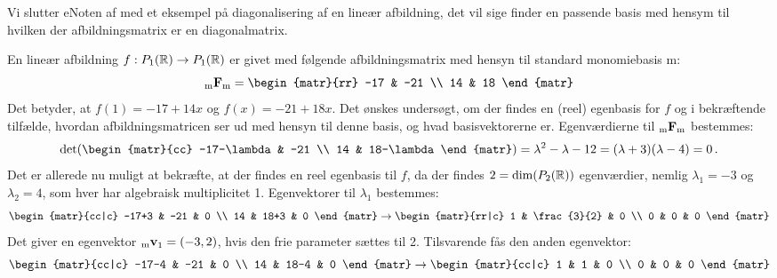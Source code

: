 Vi slutter eNoten af med et eksempel på diagonalisering af en lineær afbildning, det vil sige finder en passende basis med hensym til hvilken der afbildningsmatrix er en diagonalmatrix.

\begin{example}
En lineær afbildning $ f: P_1(\mathbb{R}) \rightarrow P_1(\mathbb{R}) $ er givet med følgende afbildningsmatrix med hensyn til standard monomiebasis m:
\begin{equation}
\matind mFm = \begin{matr}{rr} -17 & -21 \\ 14 & 18 \end{matr}
\end{equation}
Det betyder, at $ f(1) = -17 + 14x $ og $ f(x) = -21 + 18x $. Det ønskes undersøgt, om der findes en (reel) egenbasis for $ f $ og i bekræftende tilfælde, hvordan afbildningsmatricen ser ud med hensyn til denne basis, og hvad basisvektorerne er. \bs
Egenværdierne til $ {_\mathrm{m}\mathbf{F}_\mathrm{m}} $ bestemmes:
\begin{equation}
\det\!\left(\begin{matr}{cc} -17-\lambda & -21 \\ 14 & 18-\lambda \end{matr}\right) = \lambda^2-\lambda-12 = (\lambda+3)(\lambda-4) = 0\,.
\end{equation}
Det er allerede nu muligt at bekræfte, at der findes en reel egenbasis til $ f $, da der findes $ 2 = \dim(P_2(\mathbb{R})) $ egenværdier, nemlig $ \lambda_1 = -3 $ og $ \lambda_2 = 4 $, som hver har algebraisk multiplicitet 1. Egenvektorer til $ \lambda_1 $ bestemmes:
\begin{equation}
\begin{matr}{cc|c} -17+3 & -21 & 0 \\ 14 & 18+3 & 0 \end{matr} \rightarrow \begin{matr}{rr|c} 1 & \frac{3}{2} & 0 \\ 0 & 0 & 0 \end{matr}
\end{equation}
Det giver en egenvektor $ {_\mathrm{m}\mathbf{v}}_1 = (-3,2) $, hvis den frie parameter sættes til 2. Tilsvarende fås den anden egenvektor:
\begin{equation}
\begin{matr}{cc|c} -17-4 & -21 & 0 \\ 14 & 18-4 & 0 \end{matr} \rightarrow \begin{matr}{cc|c} 1 & 1 & 0 \\ 0 & 0 & 0 \end{matr}

\end{equation}
\end{example}

